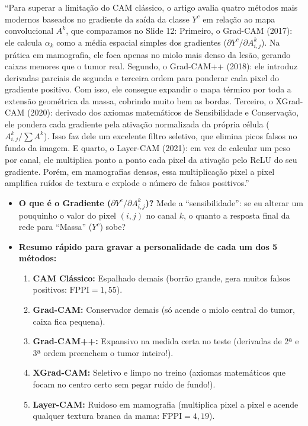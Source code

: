 \documentclass[11pt,a4paper]{article}
\newenvironment{falabox}{%
    \begin{tcolorbox}[colback=speechbg, colframe=speechborder, boxrule=1.2pt, arc=4pt, left=10pt, right=10pt, top=8pt, bottom=8pt, title={\bfseries O QUE VOCÊ DEVE FALAR (Fala Sugerida)}]%
}{%
    \end{tcolorbox}%
}
\newenvironment{explicabox}{%
    \begin{tcolorbox}[colback=explainbg, colframe=explainborder, boxrule=0.8pt, arc=4pt, left=10pt, right=10pt, top=8pt, bottom=8pt, title={\bfseries ENTENDA O QUE VOCÊ ESTÁ FALANDO (Explicação Didática de Cada Termo)}]%
}{%
    \end{tcolorbox}%
}
\begin{document}
\begin{falabox}
``Para superar a limitação do CAM clássico, o artigo avalia quatro métodos mais modernos baseados no gradiente da saída da classe $Y^c$ em relação ao mapa convolucional $A^k$, que comparamos no Slide 12:
Primeiro, o Grad-CAM (2017): ele calcula $\alpha_k$ como a média espacial simples dos gradientes ($\partial Y^c / \partial A^k_{i,j}$). Na prática em mamografia, ele foca apenas no miolo mais denso da lesão, gerando caixas menores que o tumor real.
Segundo, o Grad-CAM++ (2018): ele introduz derivadas parciais de segunda e terceira ordem para ponderar cada pixel do gradiente positivo. Com isso, ele consegue expandir o mapa térmico por toda a extensão geométrica da massa, cobrindo muito bem as bordas.
Terceiro, o XGrad-CAM (2020): derivado dos axiomas matemáticos de Sensibilidade e Conservação, ele pondera cada gradiente pela ativação normalizada da própria célula ($A^k_{i,j} / \sum A^k$). Isso faz dele um excelente filtro seletivo, que elimina picos falsos no fundo da imagem.
E quarto, o Layer-CAM (2021): em vez de calcular um peso por canal, ele multiplica ponto a ponto cada pixel da ativação pelo ReLU do seu gradiente. Porém, em mamografias densas, essa multiplicação pixel a pixel amplifica ruídos de textura e explode o número de falsos positivos.''
\end{falabox}

\begin{explicabox}
\begin{itemize}[leftmargin=*, itemsep=4pt]
    \item \textbf{O que é o Gradiente ($\partial Y^c / \partial A^k_{i,j}$)?} Mede a ``sensibilidade'': se eu alterar um pouquinho o valor do pixel $(i,j)$ no canal $k$, o quanto a resposta final da rede para ``Massa'' ($Y^c$) sobe?
    \item \textbf{Resumo rápido para gravar a personalidade de cada um dos 5 métodos:}
    \begin{enumerate}
        \item \textbf{CAM Clássico:} Espalhado demais (borrão grande, gera muitos falsos positivos: $\text{FPPI} = 1{,}55$).
        \item \textbf{Grad-CAM:} Conservador demais (só acende o miolo central do tumor, caixa fica pequena).
        \item \textbf{Grad-CAM++:} Expansivo na medida certa no teste (derivadas de 2ª e 3ª ordem preenchem o tumor inteiro!).
        \item \textbf{XGrad-CAM:} Seletivo e limpo no treino (axiomas matemáticos que focam no centro certo sem pegar ruído de fundo!).
        \item \textbf{Layer-CAM:} Ruidoso em mamografia (multiplica pixel a pixel e acende qualquer textura branca da mama: $\text{FPPI} = 4{,}19$).
    \end{enumerate}
\end{itemize}
\end{explicabox}
\end{document}
